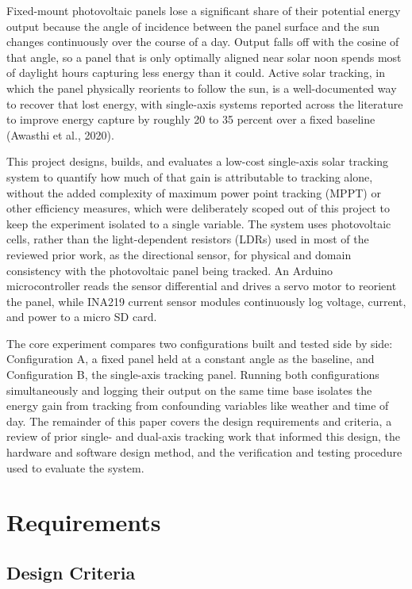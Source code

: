 \documentclass[journal]{IEEEtran}
\begin{document}
Fixed-mount photovoltaic panels lose a significant share of their potential energy
output because the angle of incidence between the panel surface and the sun changes
continuously over the course of a day. Output falls off with the cosine of that angle,
so a panel that is only optimally aligned near solar noon spends most of daylight hours
capturing less energy than it could. Active solar tracking, in which the panel
physically reorients to follow the sun, is a well-documented way to recover that lost
energy, with single-axis systems reported across the literature to improve energy
capture by roughly 20 to 35 percent over a fixed baseline (Awasthi et al., 2020).

This project designs, builds, and evaluates a low-cost single-axis solar tracking
system to quantify how much of that gain is attributable to tracking alone, without the
added complexity of maximum power point tracking (MPPT) or other efficiency measures,
which were deliberately scoped out of this project to keep the experiment isolated to a
single variable. The system uses photovoltaic cells, rather than the light-dependent
resistors (LDRs) used in most of the reviewed prior work, as the directional sensor, for
physical and domain consistency with the photovoltaic panel being tracked. An Arduino
microcontroller reads the sensor differential and drives a servo motor to reorient the
panel, while INA219 current sensor modules continuously log voltage, current, and power
to a micro SD card.

The core experiment compares two configurations built and tested side by side:
Configuration A, a fixed panel held at a constant angle as the baseline, and
Configuration B, the single-axis tracking panel. Running both configurations
simultaneously and logging their output on the same time base isolates the energy gain
from tracking from confounding variables like weather and time of day. The remainder of
this paper covers the design requirements and criteria, a review of prior single- and
dual-axis tracking work that informed this design, the hardware and software design
method, and the verification and testing procedure used to evaluate the system.

\section{Requirements}

\subsection{Design Criteria}
\end{document}

